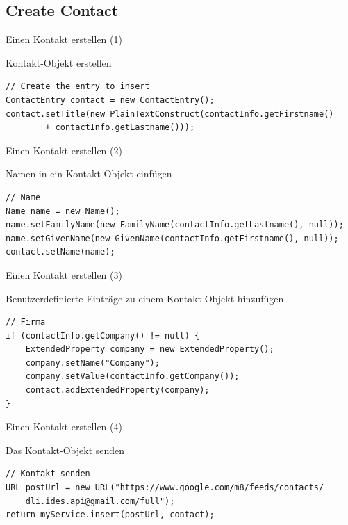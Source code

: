 \subsection*{Create Contact}

\begin{frame}[fragile]{Einen Kontakt erstellen (1)}
\begin{block}{Kontakt-Objekt erstellen}
\javalstset
\begin{lstlisting}
// Create the entry to insert
ContactEntry contact = new ContactEntry();
contact.setTitle(new PlainTextConstruct(contactInfo.getFirstname()
		+ contactInfo.getLastname()));
\end{lstlisting}
\end{block}
\end{frame}

\begin{frame}[fragile]{Einen Kontakt erstellen (2)}
\begin{block}{Namen in ein Kontakt-Objekt einfügen}
\javalstset
\begin{lstlisting}
// Name
Name name = new Name();
name.setFamilyName(new FamilyName(contactInfo.getLastname(), null));
name.setGivenName(new GivenName(contactInfo.getFirstname(), null));
contact.setName(name);
\end{lstlisting}
\end{block}
\end{frame}

\begin{frame}[fragile]{Einen Kontakt erstellen (3)}
\begin{block}{Benutzerdefinierte Einträge zu einem Kontakt-Objekt hinzufügen}
\javalstset
\begin{lstlisting}
// Firma
if (contactInfo.getCompany() != null) {
	ExtendedProperty company = new ExtendedProperty();
	company.setName("Company");
	company.setValue(contactInfo.getCompany());
	contact.addExtendedProperty(company);
}
\end{lstlisting}
\end{block}
\end{frame}

\begin{frame}[fragile]{Einen Kontakt erstellen (4)}
\begin{block}{Das Kontakt-Objekt senden}
\javalstset
\begin{lstlisting}
// Kontakt senden		
URL postUrl = new URL("https://www.google.com/m8/feeds/contacts/
	dli.ides.api@gmail.com/full");
return myService.insert(postUrl, contact);
\end{lstlisting}
\end{block}
\end{frame}

